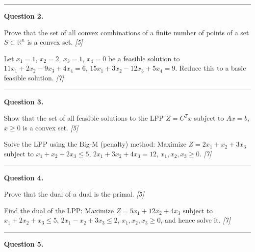 \documentclass[11pt,a4paper]{article}
\newcommand{\pts}[1]{\hfill   \textit{[#1]}}
\begin{document}
\medskip\rule{\linewidth}{0.2pt}

\medskip


\noindent   \textbf{Question 2.}

\begin{parts}
  \item Prove that the set of all convex combinations of a finite number of points of a set $S \subset \mathbb{R}^n$ is a convex set. \pts{5}
  \item Let $x_1 = 1$, $x_2 = 2$, $x_3 = 1$, $x_4 = 0$ be a feasible solution to $11x_1 + 2x_2 - 9x_3 + 4x_4 = 6$, $15x_1 + 3x_2 - 12x_3 + 5x_4 = 9$. Reduce this to a basic feasible solution. \pts{7}
\end{parts}

\medskip\rule{\linewidth}{0.2pt}

\medskip


\noindent   \textbf{Question 3.}

\begin{parts}
  \item Show that the set of all feasible solutions to the LPP $Z = C^T x$ subject to $Ax = b$, $x \ge 0$ is a convex set. \pts{5}
  \item Solve the LPP using the Big-M (penalty) method: Maximize $Z = 2x_1 + x_2 + 3x_3$ subject to $x_1 + x_2 + 2x_3 \le 5$, $2x_1 + 3x_2 + 4x_3 = 12$, $x_1, x_2, x_3 \ge 0$. \pts{7}
\end{parts}

\medskip\rule{\linewidth}{0.2pt}

\medskip


\noindent   \textbf{Question 4.}

\begin{parts}
  \item Prove that the dual of a dual is the primal. \pts{5}
  \item Find the dual of the LPP: Maximize $Z = 5x_1 + 12x_2 + 4x_3$ subject to $x_1 + 2x_2 + x_3 \le 5$, $2x_1 - x_2 + 3x_3 \le 2$, $x_1, x_2, x_3 \ge 0$, and hence solve it. \pts{7}
\end{parts}

\medskip\rule{\linewidth}{0.2pt}

\medskip


\noindent   \textbf{Question 5.}
\end{document}
